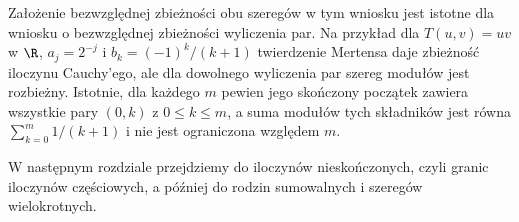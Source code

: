 \begin{uwaga}
Założenie bezwzględnej zbieżności obu szeregów w tym
wniosku jest istotne dla wniosku o bezwzględnej zbieżności
wyliczenia par. Na przykład dla $T(u,v)=uv$ w $\R$,
$a_j=2^{-j}$ i $b_k=(-1)^k/(k+1)$ twierdzenie Mertensa
daje zbieżność iloczynu Cauchy'ego, ale dla dowolnego
wyliczenia par szereg modułów jest rozbieżny.
Istotnie, dla każdego $m$ pewien jego skończony początek
zawiera wszystkie pary $(0,k)$ z $0\le k\le m$, a suma
modułów tych składników jest równa
$\sum_{k=0}^m 1/(k+1)$ i nie jest ograniczona względem $m$.
\end{uwaga}

W następnym rozdziale przejdziemy do iloczynów nieskończonych,
czyli granic iloczynów częściowych, a później do rodzin
sumowalnych i szeregów wielokrotnych.
